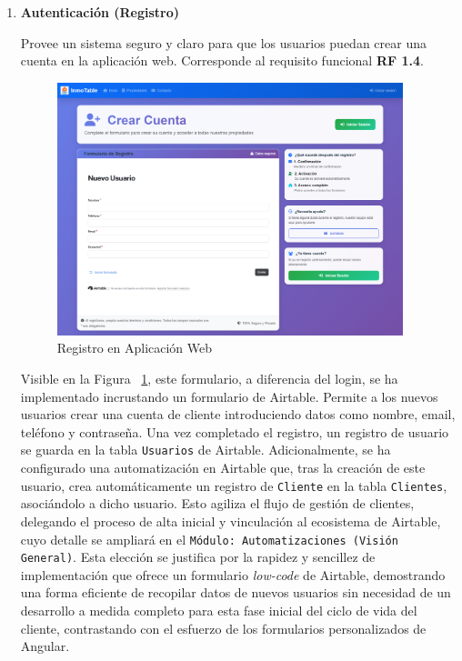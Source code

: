 \begin{enumerate}
\begin{enumerate}
        \item \textbf{Autenticación (Registro)}

        Provee un sistema seguro y claro para que los usuarios puedan crear una cuenta en la aplicación web. Corresponde al requisito funcional \textbf{RF 1.4}.

         \begin{figure}[H]
            \begin{center}
                \includegraphics[width = 0.95\textwidth]{Figuras/registro.png}
            \end{center}
            \caption{\label{fig:registro} Registro en Aplicación Web}
        \end{figure}

        Visible en la Figura ~\ref{fig:registro}, este formulario, a diferencia del login, se ha implementado incrustando un formulario de Airtable. Permite a los nuevos usuarios crear una cuenta de cliente introduciendo datos como nombre, email, teléfono y contraseña. Una vez completado el registro, un registro de usuario se guarda en la tabla \texttt{Usuarios} de Airtable. Adicionalmente, se ha configurado una automatización en Airtable que, tras la creación de este usuario, crea automáticamente un registro de \texttt{Cliente} en la tabla \texttt{Clientes}, asociándolo a dicho usuario. Esto agiliza el flujo de gestión de clientes, delegando el proceso de alta inicial y vinculación al ecosistema de Airtable, cuyo detalle se ampliará en el \texttt{Módulo: Automatizaciones (Visión General)}. Esta elección se justifica por la rapidez y sencillez de implementación que ofrece un formulario \textit{low-code} de Airtable, demostrando una forma eficiente de recopilar datos de nuevos usuarios sin necesidad de un desarrollo a medida completo para esta fase inicial del ciclo de vida del cliente, contrastando con el esfuerzo de los formularios personalizados de Angular.


\end{enumerate}
\end{enumerate}
